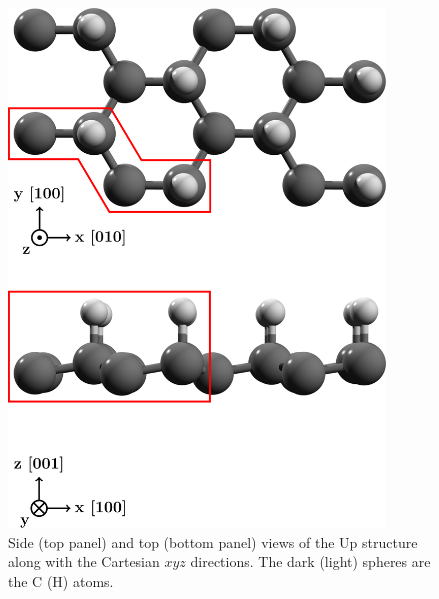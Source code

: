 \documentclass[floatfix,prb,aps,superscriptaddress,showpacs,11pt,preprint,letterpaper]{revtex4}
\def\tama{10cm}
\begin{document}
\begin{figure}[ht!]
    \centering
    \includegraphics[width=\tama]{figures/fig1}
    \caption{Side (top panel) and top (bottom panel) views of the Up
      structure along with the 
      Cartesian $xyz$ directions. The dark (light) spheres are the C (H) atoms. 
}
    \label{fig:up-struc}
\end{figure}
\end{document}
